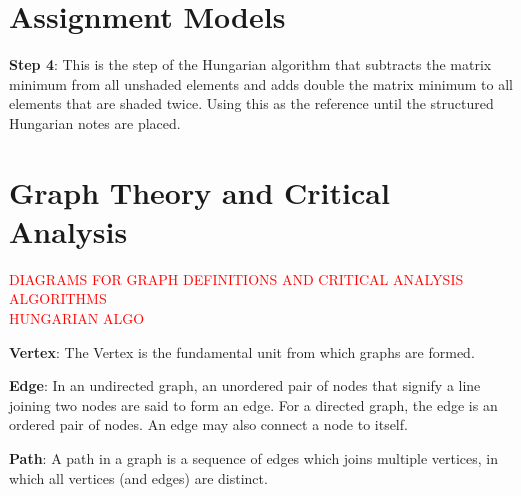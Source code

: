 %
%
%




\section{Assignment Models} \label{Module1:AsgnmtModels}

\begin{defn} \label{mod1:defn:HungAlgStep4}
	\textbf{Step 4}: This is the step of the Hungarian algorithm that subtracts the matrix minimum from all unshaded elements and adds double the matrix minimum to all elements that are shaded twice. Using this as the reference until the structured Hungarian notes are placed.
\end{defn}

\section{Graph Theory and Critical Analysis} \label{Module1:GraphTheoryCriticalAnalysis}

\textcolor{red} {DIAGRAMS FOR GRAPH DEFINITIONS  AND CRITICAL ANALYSIS ALGORITHMS}\\
\textcolor{red}{HUNGARIAN ALGO}
\begin{defn}\label{mod1:defn:Vertex}
   \textbf{Vertex}: The Vertex is the fundamental unit from which graphs are formed.
\end{defn}

\begin{defn}\label{mod1:defn:Edge}
   \textbf{Edge}: In an undirected graph, an unordered pair of nodes that signify  a line joining  two nodes are said to form an edge. For a directed graph, the edge is an ordered pair of nodes. An edge may also connect a node to itself.
\end{defn}

\begin{defn}\label{mod1:defn:Path}
    \textbf{Path}: A path in a graph is a sequence of edges which joins multiple vertices, in which all vertices (and edges) are distinct.
\end{defn}

